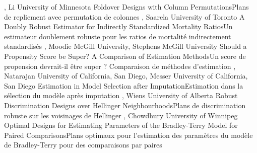 {
,  {Li}
{University of Minnesota}
}
{Foldover Designs with Column Permutations}{Plans de repliement avec permutation de colonnes }
{\bubbleE \enspace \screenE}
{
,  {Saarela}
{University of Toronto}
}
{A Doubly Robust Estimator for Indirectly Standardized Mortality Ratios}{Un estimateur doublement robuste pour les ratios de mortalité indirectement standardisés}
{\bubbleE \enspace \screenE}
{
,  {Moodie}
{McGill University},  {Stephens}
{McGill University}
}
{Should a Propensity Score be Super? A Comparison of Estimation Methods}{Un score de propension devrait-il être super ? Comparaison de méthodes d’estimation}
{\bubbleE \enspace \screenE}
{
,  {Natarajan}
{University of California, San Diego},  {Messer}
{University of California, San Diego}
}
{Estimation in Model Selection after Imputation}{Estimation dans la sélection du modèle après imputation }
{\bubbleE \enspace \screenE}
{
,  {Wiens}
{University of Alberta}
}
{ Robust Discrimination Designs over Hellinger Neighbourhoods}{Plans de discrimination robuste sur les voisinages de Hellinger}
{\bubbleE \enspace \screenE}
{
,  {Chowdhury}
{University of Winnipeg}
}
{Optimal Designs for Estimating Parameters of the Bradley-Terry Model for Paired Comparisons}{Plans optimaux pour l'estimation des paramètres du modèle de Bradley-Terry pour des comparaisons par paires}
{\bubbleE \enspace \screenE}


